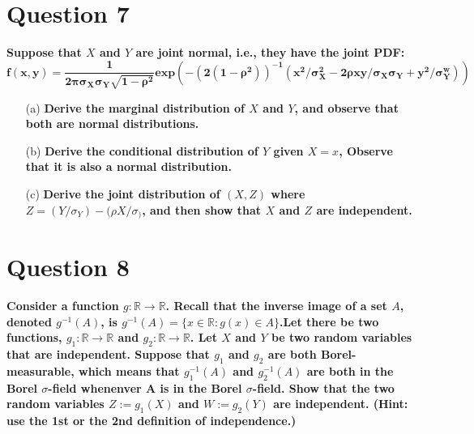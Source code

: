 \documentclass{article}
\newcommand{\R}{\mathbb{R}}
\begin{document}

\section*{Question 7}
\textbf{Suppose that $X$ and $Y$ are joint normal, i.e., they have the joint PDF:}
\[
	\mathbf{f(x,y) = \frac{1}{2\pi\sigma_X\sigma_Y\sqrt{1-\rho^2}}\text{exp}(-(2(1-\rho^2))^{-1}(x^2/\sigma^2_X-2\rho xy/\sigma_X\sigma_Y + y^2/\sigma_Y^w))}
\]
\begin{itemize}
	\item[(a)] \textbf{Derive the marginal distribution of $X$ and $Y$, and observe that both are normal distributions.}
	\bigskip \\


	\item[(b)] \textbf{Derive the conditional distribution of $Y$ given $X=x$, Observe that it is also a normal distribution.}
	\bigskip \\


	\item[(c)] \textbf{Derive the joint distribution of $(X,Z)$ where $Z=(Y/\sigma_Y)-(\rho X/\sigma_)$, and then show that $X$ and $Z$ are independent.}
	\bigskip \\
	
	
\end{itemize}



\section*{Question 8}
\textbf{Consider a function $g:\R\rightarrow\R$. Recall that the inverse image of a set $A$, denoted $g^{-1}(A)$, is $g^{-1}(A)=\{x\in\R:g(x)\in A\}$.Let there be two functions, $g_1 : \R \rightarrow \R$ and $g_2 : \R\rightarrow\R$. Let $X$ and $Y$ be two random variables that are independent. Suppose that $g_1$ and $g_2$ are both Borel-measurable, which means that $g^{-1}_1(A)$ and $g^{-1}_2(A)$ are both in the Borel $\sigma$-field whenenver A is in the Borel $\sigma$-field. Show that the two random variables $Z := g_1(X)$ and $W := g_2(Y)$ are independent. (Hint: use the 1st or the 2nd definition of independence.)}
\bigskip \\


\end{document}

